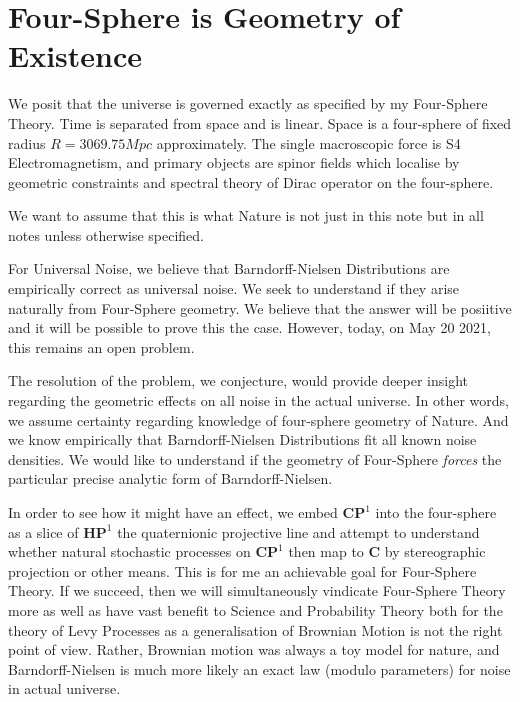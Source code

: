 \documentclass{amsart}
\author{Zulfikar Moinuddin Ahmed}
\date{\today}
\begin{document}
\maketitle

\section{Four-Sphere is Geometry of Existence}

We posit that the universe is governed exactly as specified by my Four-Sphere Theory.  Time is separated from space and is linear.  Space is a four-sphere of fixed radius $R=3069.75Mpc$ approximately.  The single macroscopic force is S4 Electromagnetism, and primary objects are spinor fields which localise by geometric constraints and spectral theory of Dirac operator on the four-sphere.

We want to assume that this is what Nature is not just in this note but in all notes unless otherwise specified.  

For Universal Noise, we believe that Barndorff-Nielsen Distributions are empirically correct as universal noise.  We seek to understand if they arise naturally from Four-Sphere geometry.  We believe that the answer will be posiitive and it will be possible to prove this the case.  However, today, on May 20 2021, this remains an open problem.  

The resolution of the problem, we conjecture, would provide deeper insight regarding the geometric effects on all noise in the actual universe.  In other words,  we assume certainty regarding knowledge of four-sphere geometry of Nature.  And we know empirically that Barndorff-Nielsen Distributions fit all known noise densities.  We would like to understand if the geometry of Four-Sphere {\em forces} the particular precise analytic form of Barndorff-Nielsen. 

In order to see how it might have an effect, we embed $\mathbf{CP}^1$ into the four-sphere as a slice of $\mathbf{HP}^1$ the quaternionic projective line and attempt to understand whether natural stochastic processes on $\mathbf{CP}^1$ then map to $\mathbf{C}$ by stereographic projection or other means.  This is for me an achievable goal for Four-Sphere Theory.  If we succeed, then we will simultaneously vindicate Four-Sphere Theory more as well as have vast benefit to Science and Probability Theory both for the theory of Levy Processes as a generalisation of Brownian Motion is not the right point of view.  Rather, Brownian motion was always a toy model for nature, and Barndorff-Nielsen is much more likely an exact law (modulo parameters) for noise in actual universe. 
\end{document}
